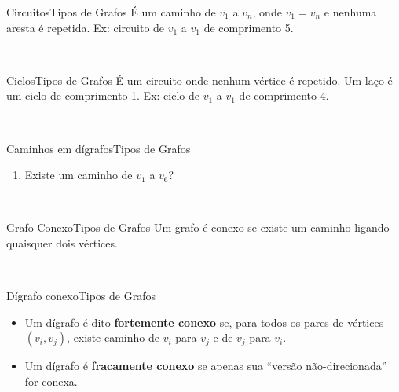 \documentclass[t]{beamer}
\begin{document}

\begin{ftst}{Circuitos}{Tipos de Grafos}
É um caminho de $v_1$ a $v_n$, onde $v_1 = v_n$ e nenhuma aresta é repetida.
\vone
Ex: circuito de $v_1$ a $v_1$ de comprimento 5.

\vone
\centering
\\


\end{ftst}


\begin{ftst}{Ciclos}{Tipos de Grafos}
É um circuito onde nenhum vértice é repetido.
\vone
Um laço é um ciclo de comprimento 1.
\vone
Ex: ciclo de $v_1$ a $v_1$ de comprimento 4.

\vone
\centering
\\


\end{ftst}


\begin{ftst}{Caminhos em dígrafos}{Tipos de Grafos}
\begin{enumerate}
    \item Existe um caminho de $v_1$ a $v_6$?
\end{enumerate}

\vone
\centering
\\


\end{ftst}


\begin{ftst}{Grafo Conexo}{Tipos de Grafos}
Um grafo é conexo se existe um caminho ligando quaisquer dois vértices.
\vone

\vone
\centering
\\


\end{ftst}


\begin{ftst}{Dígrafo conexo}{Tipos de Grafos}
\begin{itemize}
    \item Um dígrafo é dito \textbf{fortemente conexo} se, para todos os pares de vértices $(v_i,v_j)$, existe caminho de $v_i$ para $v_j$ e de $v_j$ para $v_i$. 
    \item Um dígrafo é \textbf{fracamente conexo} se apenas sua “versão não-direcionada” for conexa.
\end{itemize}

\vone

\vone
\centering
\\


\end{ftst}

\end{document}
